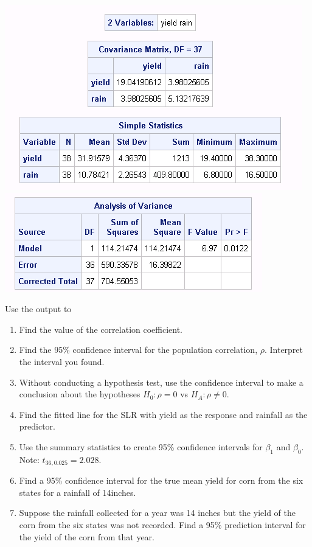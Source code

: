 \documentclass{report}
\begin{document}
\begin{center}
\includegraphics[scale=0.7]{cornsummary}\includegraphics[scale=0.7]{cornslranova}
\end{center}


Use the output to 
\begin{enumerate}
\item Find the value of the correlation coefficient.  
\item Find the 95\% confidence interval for the population correlation, $\rho$.  Interpret the interval you found.
\item Without conducting a hypothesis test, use the confidence interval to make a conclusion about the hypotheses $H_0: \rho=0$ vs $H_A: \rho\neq 0$.
\item Find the fitted line for the SLR with yield as the response and rainfall as the predictor.
\item Use the summary statistics to create 95\% confidence intervals for $\beta_1$ and $\beta_0$.  Note: $t_{36, 0.025}=2.028$.
\item Find a 95\% confidence interval for the true mean yield for corn from the six states for a rainfall of 14inches.
\item Suppose the rainfall collected for a year was 14 inches but the yield of the corn from the six states was not recorded.  Find a 95\% prediction interval for the yield of the corn from that year.
\end{enumerate}
\end{document}
